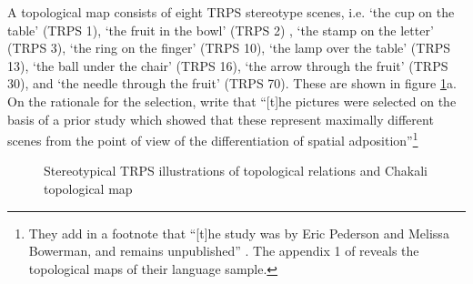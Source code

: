  A topological map consists of  eight TRPS stereotype
scenes, i.e.  `the cup on the table' (TRPS 1),  `the fruit in the bowl'  (TRPS
2) ,  `the stamp on the letter'  (TRPS  3), `the ring on the finger'  (TRPS 10),
`the lamp over the table'  (TRPS  13),  `the ball under the chair'  (TRPS 16), 
`the arrow through the fruit'  (TRPS  30),  and  `the needle through the fruit' 
(TRPS  70).  These  are shown in figure \ref{fig:TopoMaps}a. On the
rationale for the selection, \citet[10-11]{Levi06a} write that ``[t]he pictures
were selected on the basis of a prior study which showed that these represent
maximally different scenes from the point of view of the differentiation of
spatial adposition''\footnote{They add in a footnote that ``[t]he study was by
Eric Pederson and Melissa Bowerman, and remains unpublished''
\citep[11]{Levi06a}. The appendix 1 of \citet[553]{Levi06} reveals the 
topological maps of
their language sample.} 



\begin{figure}[htb]

 \centering

\qquad

\caption[Stereotypical TRPS and Chakali topological map]{Stereotypical TRPS
illustrations of topological relations and Chakali topological map
\label{fig:TopoMaps}}

\end{figure}


